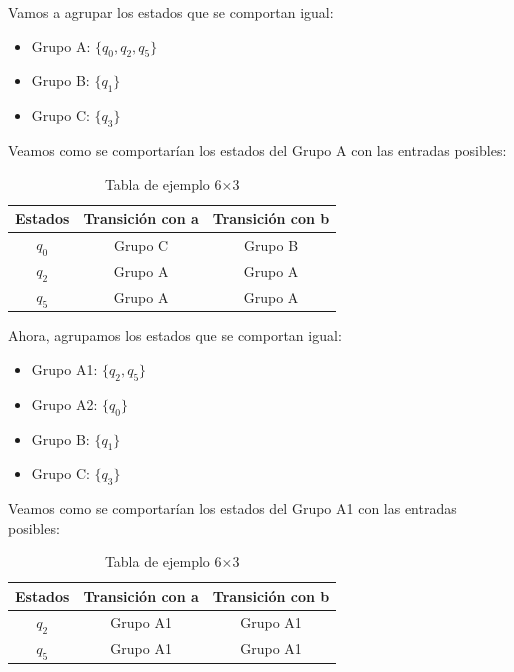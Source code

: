 \begin{enumerate}
 Vamos a agrupar los estados que se comportan igual:\\
 \begin{itemize}
    \item Grupo A: $\{q_0, q_2, q_5\}$
    \item Grupo B: $\{q_1\}$
    \item Grupo C: $\{q_3\}$
 \end{itemize}
    Veamos como se comportarían los estados del Grupo A con las entradas posibles:  \\    
    \begin{table}[h!]
    \centering      
    \begin{tabular}{|c|c|c|}
    \hline
    \textbf{Estados} & \textbf{Transición con a} & \textbf{Transición con b } \\
    \hline
    $q_0$ & Grupo C & Grupo B\\     
    \hline
    $q_2$  & Grupo A & Grupo A \\       
    \hline
    $q_5$ & Grupo A & Grupo A \\    
    \hline
    \end{tabular}       
    \caption{Tabla de ejemplo 6×3}
    \label{tab:ejemplo}
    \end{table} 
    Ahora, agrupamos los estados que se comportan igual:\\
    \begin{itemize}     
        \item Grupo A1: $\{q_2, q_5\}$
        \item Grupo A2: $\{q_0\}$
        \item Grupo B: $\{q_1\}$
        \item Grupo C: $\{q_3\}$
    \end{itemize}
    Veamos como se comportarían los estados del Grupo A1 con las entradas posibles:   \\   
    \begin{table}[h!]        
    \centering      
    \begin{tabular}{|c|c|c|}        
    \hline
    \textbf{Estados} & \textbf{Transición con a} & \textbf{Transición con b } \\
    \hline
    $q_2$  & Grupo A1 & Grupo A1 \\ 
    \hline
    $q_5$ & Grupo A1 & Grupo A1 \\  
    \hline
    \end{tabular}       
    \caption{Tabla de ejemplo 6×3}
    \label{tab:ejemplo} 
    \end{table}

\end{enumerate}
